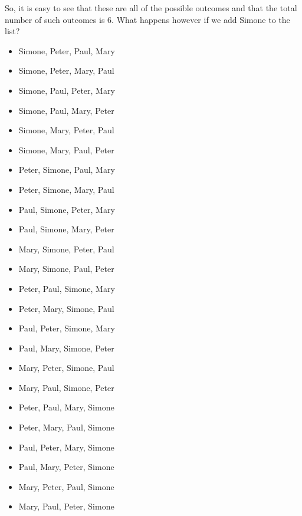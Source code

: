 \documentclass[10pt,]{book}
\theoremstyle{plain}
\theoremstyle{definition}
\theoremstyle{definition}
\theoremstyle{definition}
\numberwithin{equation}{section}
\begin{document}
So, it is easy to see that these are all of the possible outcomes and that the total number of such outcomes is 6. What happens however if we add Simone to the list?
\leavevmode%
\begin{itemize}[label=\textbullet]
\item{}Simone, Peter, Paul, Mary%
\item{}Simone, Peter, Mary, Paul%
\item{}Simone, Paul, Peter, Mary%
\item{}Simone, Paul, Mary, Peter%
\item{}Simone, Mary, Peter, Paul%
\item{}Simone, Mary, Paul, Peter%
\item{}Peter, Simone, Paul, Mary%
\item{}Peter, Simone, Mary, Paul%
\item{}Paul, Simone, Peter, Mary%
\item{}Paul, Simone, Mary, Peter%
\item{}Mary, Simone, Peter, Paul%
\item{}Mary, Simone, Paul, Peter%
\item{}Peter, Paul, Simone, Mary%
\item{}Peter, Mary, Simone, Paul%
\item{}Paul, Peter, Simone, Mary%
\item{}Paul, Mary, Simone, Peter%
\item{}Mary, Peter, Simone, Paul%
\item{}Mary, Paul, Simone, Peter%
\item{}Peter, Paul, Mary, Simone%
\item{}Peter, Mary, Paul, Simone%
\item{}Paul, Peter, Mary, Simone%
\item{}Paul, Mary, Peter, Simone%
\item{}Mary, Peter, Paul, Simone%
\item{}Mary, Paul, Peter, Simone%
\end{itemize}
\end{document}
